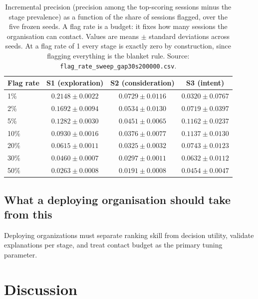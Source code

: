 \documentclass[a4paper]{article}
\begin{document}
\begin{table}[htbp]
\centering
\caption{Incremental precision (precision among the top-scoring sessions minus
the stage prevalence) as a function of the share of sessions flagged, over the
five frozen seeds. A flag rate is a budget: it fixes how many sessions the
organisation can contact. Values are means $\pm$ standard deviations across
seeds. At a flag rate of 1 every stage is exactly zero by construction, since
flagging everything is the blanket rule. Source:
\texttt{flag\_rate\_sweep\_gap30s200000.csv}.}
\label{tab:sweep}
\small
\begin{tabular}{@{}lccc@{}}
\toprule
\textbf{Flag rate} & \textbf{S1 (exploration)} & \textbf{S2 (consideration)} &
\textbf{S3 (intent)} \\
\midrule
1\%  & $0.2148 \pm 0.0022$ & $0.0729 \pm 0.0116$ & $0.0320 \pm 0.0767$ \\
2\%  & $0.1692 \pm 0.0094$ & $0.0534 \pm 0.0130$ & $0.0719 \pm 0.0397$ \\
5\%  & $0.1282 \pm 0.0030$ & $0.0451 \pm 0.0065$ & $0.1162 \pm 0.0237$ \\
10\% & $0.0930 \pm 0.0016$ & $0.0376 \pm 0.0077$ & $\mathbf{0.1137 \pm 0.0130}$ \\
20\% & $0.0615 \pm 0.0011$ & $0.0325 \pm 0.0032$ & $\mathbf{0.0743 \pm 0.0123}$ \\
30\% & $0.0460 \pm 0.0007$ & $0.0297 \pm 0.0011$ & $\mathbf{0.0632 \pm 0.0112}$ \\
50\% & $0.0263 \pm 0.0008$ & $0.0191 \pm 0.0008$ & $\mathbf{0.0454 \pm 0.0047}$ \\
\bottomrule
\end{tabular}
\end{table}

\subsection{What a deploying organisation should take from this}
\label{sec:deployment}

Deploying organizations must separate ranking skill from decision utility, validate
explanations per stage, and treat contact budget as the primary tuning parameter.

\section{Discussion}
\label{sec:discussion}
\end{document}
